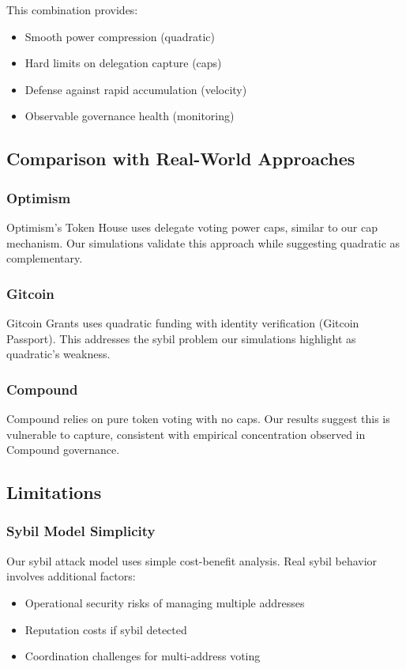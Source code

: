 This combination provides:
\begin{itemize}
    \item Smooth power compression (quadratic)
    \item Hard limits on delegation capture (caps)
    \item Defense against rapid accumulation (velocity)
    \item Observable governance health (monitoring)
\end{itemize}

\subsection{Comparison with Real-World Approaches}

\subsubsection{Optimism}

Optimism's Token House uses delegate voting power caps, similar to our cap mechanism. Our simulations validate this approach while suggesting quadratic as complementary.

\subsubsection{Gitcoin}

Gitcoin Grants uses quadratic funding with identity verification (Gitcoin Passport). This addresses the sybil problem our simulations highlight as quadratic's weakness.

\subsubsection{Compound}

Compound relies on pure token voting with no caps. Our results suggest this is vulnerable to capture, consistent with empirical concentration observed in Compound governance.

\subsection{Limitations}

\subsubsection{Sybil Model Simplicity}

Our sybil attack model uses simple cost-benefit analysis. Real sybil behavior involves additional factors:
\begin{itemize}
    \item Operational security risks of managing multiple addresses
    \item Reputation costs if sybil detected
    \item Coordination challenges for multi-address voting
\end{itemize}

